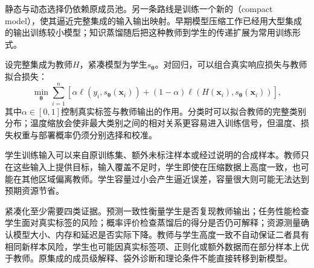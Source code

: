 静态与动态选择仍依赖原成员池。另一条路线是训练一个新的（compact model），使其逼近完整集成的输入输出映射。早期模型压缩工作已经用大型集成的输出训练较小模型；知识蒸馏随后把这种教师到学生的传递扩展为常用训练形式。

设完整集成为教师$H$，紧凑模型为学生$s_{\bm{\theta}}$。对回归，可以组合真实响应损失与教师拟合损失：
\begin{equation}
  \min_{\bm{\theta}}
  \sum_{i=1}^{n}
  \left[
    \alpha\ell\!\left(y_i,s_{\bm{\theta}}(\bm{x}_i)\right)
    +(1-\alpha)
    \ell\!\left(H(\bm{x}_i),s_{\bm{\theta}}(\bm{x}_i)\right)
  \right],
  \label{eq:ensemble-compression-objective}
\end{equation}
其中$\alpha\in[0,1]$控制真实标签与教师输出的作用。分类时可以拟合教师的完整类别分布；温度缩放会使非最大类别之间的相对关系更容易进入训练信号，但温度、损失权重与部署概率仍须分别选择和校准。

学生训练输入可以来自原训练集、额外未标注样本或经过说明的合成样本。教师只在这些输入上提供目标，输入覆盖不足时，学生即使在压缩数据上高度一致，也可能在其他区域偏离教师。学生容量过小会产生逼近误差，容量很大则可能无法达到预期资源节省。

紧凑化至少需要四类证据。预测一致性衡量学生是否复现教师输出；任务性能检查学生面对真实标签的风险；概率评价检查蒸馏后的得分是否仍可解释；资源测量确认模型大小、内存和延迟是否实际下降。教师与学生高度一致不自动保证二者具有相同新样本风险，学生也可能因真实标签项、正则化或额外数据而在部分样本上优于教师。原集成的成员级解释、袋外诊断和理论条件不能直接转移到新模型。
